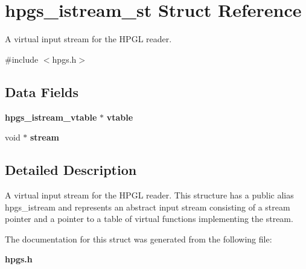 \section{hpgs\_\-istream\_\-st Struct Reference}
\label{structhpgs__istream__st}


A virtual input stream for the HPGL reader.  




{\ttfamily \#include $<$hpgs.h$>$}

\subsection*{Data Fields}
\begin{DoxyCompactItemize}
\item 
{\bf hpgs\_\-istream\_\-vtable} $\ast$ {\bfseries vtable}\label{structhpgs__istream__st_aa95c5bd08db87fc8107da506e04a6ae8}

\item 
void $\ast$ {\bfseries stream}\label{structhpgs__istream__st_ae39160d1208f499051fb6490de0a350b}

\end{DoxyCompactItemize}


\subsection{Detailed Description}
A virtual input stream for the HPGL reader. This structure has a public alias {\ttfamily hpgs\_\-istream} and represents an abstract input stream consisting of a stream pointer and a pointer to a table of virtual functions implementing the stream. 

The documentation for this struct was generated from the following file:\begin{DoxyCompactItemize}
\item 
{\bf hpgs.h}\end{DoxyCompactItemize}
